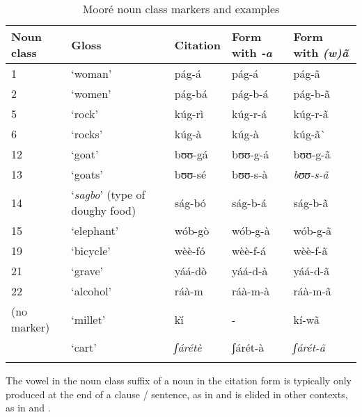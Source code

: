 \documentclass[output=paper]{langsci/langscibook}
\begin{document}
\begin{table}[h]
  	\caption{Mooré noun class markers and examples}
  \label{tab:teo:1} 
\begin{tabularx}{\textwidth}{lXlll}
\lsptoprule
Noun class & Gloss & Citation & Form with \textit{-a} & Form with\textit{ (w)ã}\footnotemark{}\\
\midrule
1 & ‘woman’ &  pág-á  &  pág-á  & pág-ã\\

 2 &‘women’ & pág-bá &  pág-b-á &  pág-b-ã\\
 
 5 & ‘rock’ &  kúg-rì &  kúg-r-á &  kúg-r-ã\\
 
6 &‘rocks’ & kúg-à &  kúg-à & kúg-ã\`{} \\

12 &‘goat’ & bʊʊ-gá &  bʊʊ-g-á &  bʊʊ-g-ã\\

13 & ‘goats’ &  bʊʊ-sé &  bʊʊ-s-à &
\itshape bʊʊ-s-ã\\

14 & ‘\textit{sagbo}’ (type of doughy food) &  ság-bó &  ság-b-á & ság-b-ã\\

15 & ‘elephant’ & wób-gò & wób-g-à & wób-g-ã\\

19 &
‘bicycle’ & wèè-fó &  wèè-f-á &  wèè-f-ã\\

21 & ‘grave’ & yáá-dò & yáá-d-à &  yáá-d-ã\\

22 & ‘alcohol’ & ráà-m  & ráà-m-à  &  ráà-m-ã\\

(no marker) & ‘millet’ & k\`{í} & - & kí-wã  \\
& ‘cart’ & \itshape ʃárétè & ʃárét-à & \itshape ʃárét-ã\\
\lspbottomrule
\end{tabularx}
\end{table}

The vowel in the noun class suffix of a noun in the citation form is typically only produced at the end of a clause / sentence, as in  and is elided in other contexts, as in  and .
\end{document}
